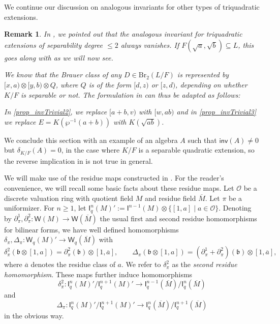 \documentclass{amsart}
\newtheorem{remark}[definition]{Remark}
\numberwithin{equation}{section}
\newcommand{\bb}{\mathfrak{b}} %
\newcommand{\BrTwo}{\mathrm{Br}_2}
\newcommand{\quat}[1]{[#1)}
\newcommand{\I}{\mathsf{I}}
\newcommand{\W}{\mathsf{W}}
\newcommand{\inv}{\mathsf{inv}}
\begin{document}
We continue our discussion on analogous invariants for other types of triquadratic extensions.

\begin{remark}
    In , we pointed out that the analogous invariant for triquadratic extensions of separability degree $\leq 2$ always vanishes. 
    If $F(\sqrt a, \sqrt b) \subseteq L$, this goes along with  as we will now see.
    
    We know that the Brauer class of any $D \in \BrTwo(L/F)$ is represented by $\quat{x, a} \otimes \quat{y, b} \otimes Q$, where $Q$ is of the form $\quat{d, z}$ or $\quat{z, d}$, depending on whether $K / F$ is separable or not.
    The formulation in  can thus be adapted as follows:
    
    In \ref{prop_invTrivial2}, we replace $\quat{a + b, v}$ with $\quat{w, ab}$ and in \ref{prop_invTrivial3} we replace $E = K(\wp^{-1}(a + b))$ with $K(\sqrt{ab})$.
\end{remark}

We conclude this section with an example of an algebra $A$ such that $\inv(A) \neq 0$ but $\delta_{K / F}(A) = 0$, in the case where $K / F$ is a separable quadratic extension, so the reverse implication in  is not true in general.

We will make use of the residue maps constructed in \cite[Section 6]{BarryChapmanLaghribi_DescentBiquaternion}. 
For the reader's convenience, we will recall some basic facts about these residue maps.
Let $\mathcal O$ be a discrete valuation ring with quotient field $M$ and residue field $\overline M$.
Let $\pi$ be a uniformizer.
For $n \geq 1$, let $\I^n_q(M)' := \I^{n-1}(M) \otimes \{[1, a] \mid a \in \mathcal O\}$.
Denoting by $\partial_\pi^1, \partial_\pi^2: \W(M) \to \W(\overline M)$ the usual first and second residue homomorphisms for bilinear forms, we have well defined homomorphisms $\delta_\pi, \Delta_\pi: \W_q(M)' \to \W_q(\overline M)$ with
\[\delta_\pi^2(\bb \otimes [1, a]) = \partial_\pi^2(\bb) \otimes [1, \overline a], \quad \quad \Delta_\pi(\bb \otimes [1, a]) = (\partial_\pi^1 +\partial_\pi^2)(\bb) \otimes [1, \overline a],\]
where $\overline a$ denotes the residue class of $a$.
We refer to $\delta_\pi^2$ as the \emph{second residue homomorphism}.
These maps further induce homomorphisms
\[\delta_\pi^2: \I^n_q(M)' / \I^{n+1}_q(M)' \to \I^{n-1}_q(\overline M) / \I^{n}_q(\overline M)\]
and
\[ \Delta_\pi: \I^n_q(M)' / \I^{n+1}_q(M)' \to \I^{n}_q(\overline M) / \I^{n + 1}_q(\overline M)\]
in the obvious way.
\end{document}
